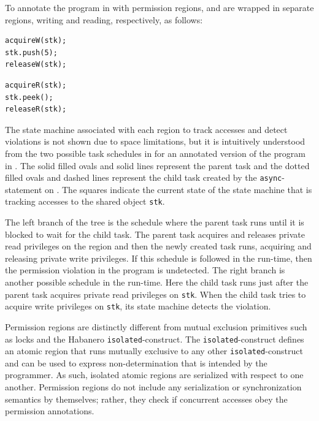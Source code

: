 To annotate the program in  with
permission regions,  and  are
wrapped in separate regions, writing and reading, respectively, as follows:
\begin{lstlisting}
acquireW(stk);
stk.push(5);
releaseW(stk);
\end{lstlisting}
\begin{lstlisting}
acquireR(stk);
stk.peek();
releaseR(stk);
\end{lstlisting}

The state machine associated with each region to track accesses and
detect violations is not shown due to space limitations, but it is intuitively
understood from the two possible task schedules in
 for an annotated version of the
program in . The solid filled ovals and
solid lines represent the parent task and the dotted filled ovals and
dashed lines represent the child task created by the
\texttt{async}-statement on . The squares indicate the current state of
the state machine that is tracking accesses to the shared object
\texttt{stk}.

The left branch of the tree is the schedule where the parent task runs
until it is blocked to wait for the child task. The parent task acquires
and releases private read privileges on the region and then the newly
created task runs, acquiring and releasing private write
privileges. If this schedule is followed in the run-time, then the
permission violation in the program is undetected. The right branch is another
possible schedule in the run-time. Here the child task runs just after
the parent task acquires private read privileges on {\tt stk}. When the
child task tries to acquire write privileges on {\tt stk}, its
state machine detects the violation.

Permission regions are distinctly different from mutual exclusion primitives such as locks and the Habanero 
\texttt{isolated}-construct. The \texttt{isolated}-construct defines
an atomic region that runs mutually exclusive to any other
\texttt{isolated}-construct and can be used to express  non-determination that is
intended by the programmer.  As such, isolated atomic regions are
serialized with respect to one another. Permission regions do not
include any serialization or synchronization semantics by themselves; rather, they check if concurrent accesses obey the permission annotations.
